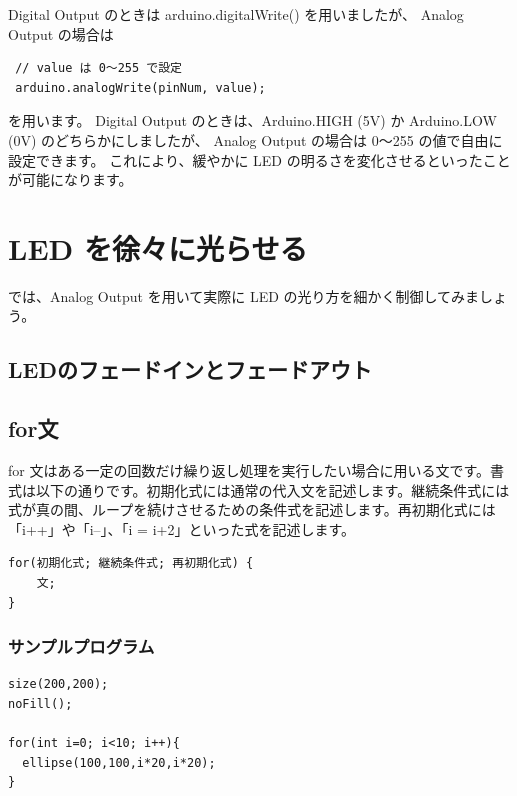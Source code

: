 \documentclass[11pt,a4paper]{jarticle}
\begin{document}
Digital Output のときは arduino.digitalWrite() を用いましたが、
Analog Output の場合は
\begin{lstlisting}
 // value は 0〜255 で設定
 arduino.analogWrite(pinNum, value);
\end{lstlisting}
を用います。
Digital Output のときは、Arduino.HIGH (5V) か Arduino.LOW (0V) のどちらかにしましたが、
Analog Output の場合は 0〜255 の値で自由に設定できます。
これにより、緩やかに LED の明るさを変化させるといったことが可能になります。

\newpage

\section{LED を徐々に光らせる}
では、Analog Output を用いて実際に LED の光り方を細かく制御してみましょう。

\subsection{LEDのフェードインとフェードアウト}

\subsection*{for文}
for 文はある一定の回数だけ繰り返し処理を実行したい場合に用いる文です。書式は以下の通りです。初期化式には通常の代入文を記述します。継続条件式には式が真の間、ループを続けさせるための条件式を記述します。再初期化式には「i++」や「i--」、「i = i+2」といった式を記述します。

\begin{lstlisting}
for(初期化式; 継続条件式; 再初期化式) {
	文;
}
\end{lstlisting}

\subsubsection*{サンプルプログラム}
\begin{lstlisting}
size(200,200);
noFill();

for(int i=0; i<10; i++){
  ellipse(100,100,i*20,i*20);
}
\end{lstlisting}
\end{document}
